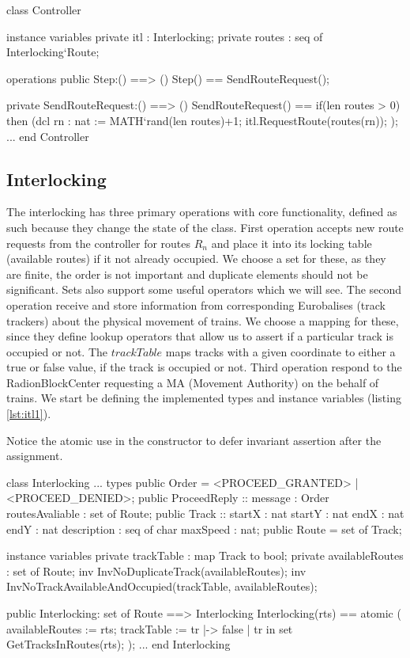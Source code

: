 \documentclass[preprint,12pt]{elsarticle}
\begin{document}
\begin{vdmsl}[label=lst:controller,caption=Definitions and SendRouteReques() operation in the Controller.]
	class Controller
	
	instance variables
	private itl : Interlocking;
	private routes : seq of Interlocking`Route;
	
	operations
	public Step:() ==> ()
	Step() == SendRouteRequest();
	
	private SendRouteRequest:() ==> ()
	SendRouteRequest() ==
	if(len routes > 0) then
		(dcl rn : nat := MATH`rand(len routes)+1;
			itl.RequestRoute(routes(rn));
	);
	...
	end Controller
\end{vdmsl}

\subsection{Interlocking}

The interlocking has three primary operations with core functionality, defined as such because they change the state of the class. First operation accepts new route requests from the controller for routes $R_{n}$ and place it into its locking table (available routes) if it not already occupied. We choose a set for these, as they are finite, the order is not important and duplicate elements should not be significant. Sets also support some useful operators which we will see. The second operation receive and store information from corresponding Eurobalises (track trackers) about the physical movement of trains. We choose a mapping for these, since they define lookup operators that allow us to assert if a particular track is occupied or not. The $trackTable$ maps tracks with a given coordinate to either a true or false value, if the track is occupied or not. Third operation respond to the RadionBlockCenter requesting a MA (Movement Authority) on the behalf of trains. We start be defining the implemented types and instance variables (listing \ref{lst:itl1}).

Notice the atomic use in the constructor to defer invariant assertion after the assignment.

\begin{vdmsl}[label=lst:itl1,caption=Types and state information and constructor for the Interlocking class.]
	class Interlocking
	...
	types
	public Order = <PROCEED_GRANTED> | <PROCEED_DENIED>;
	public ProceedReply :: message : Order
	routesAvaliable : set of Route;						 
	public Track :: startX : nat
					startY : nat
					endX : nat
					endY : nat
					description : seq of char
					maxSpeed : nat;
	public Route = set of Track;
	
	instance variables
	private trackTable : map Track to bool;
	private availableRoutes : set of Route;
	inv InvNoDuplicateTrack(availableRoutes);
	inv InvNoTrackAvailableAndOccupied(trackTable,
	 availableRoutes);
	
	public Interlocking: set of Route ==> Interlocking
	Interlocking(rts) ==
	atomic (
		availableRoutes := rts;
		trackTable := { tr |-> false |
			 tr in set GetTracksInRoutes(rts)};
	);
	...
	end Interlocking
\end{vdmsl}
\end{document}
